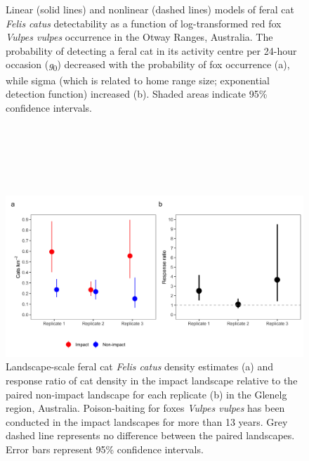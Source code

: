 \documentclass[11pt,a4paper,titlepage,twoside,openright]{style/unimelbthesis}
\begin{document}
\begin{mainmatter}
\begin{figure}
{}

\caption{Linear (solid lines) and nonlinear (dashed lines) models of feral cat \textit{Felis catus} detectability as a function of log-transformed red fox \textit{Vulpes vulpes} occurrence in the Otway Ranges, Australia. The probability of detecting a feral cat in its activity centre per 24-hour occasion (\textit{g}\textsubscript{0}) decreased with the probability of fox occurrence (a), while sigma (which is related to home range size; exponential detection function) increased (b). Shaded areas indicate 95\% confidence intervals.}\label{fig:detcor}
\end{figure}
\newpage

\(~\)

\(~\)

\(~\)
\begin{figure}

{\centering \includegraphics[width=1\linewidth]{figure/c3/glenelg_estimates_600dpi} 

}

\caption{Landscape-scale feral cat \textit{Felis catus} density estimates (a) and response ratio of cat density in the impact landscape relative to the paired non-impact landscape for each replicate (b) in the Glenelg region, Australia. Poison-baiting for foxes \textit{Vulpes vulpes} has been conducted in the impact landscapes for more than 13 years. Grey dashed line represents no difference between the paired landscapes. Error bars represent 95\% confidence intervals.}\label{fig:diffg}
\end{figure}
\newpage

\(~\)

\(~\)

\(~\)
\begin{figure}


\end{figure}
\end{mainmatter}
\end{document}
